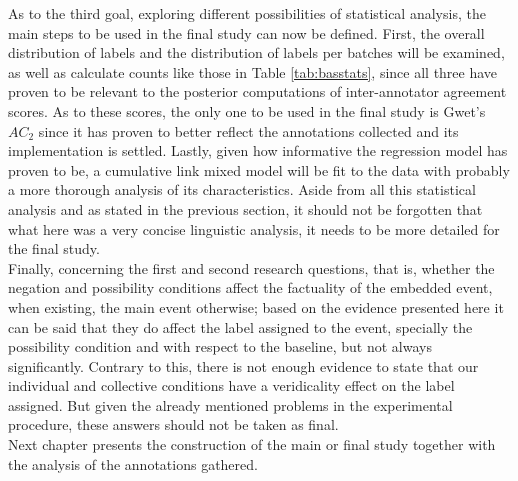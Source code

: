 As to the third goal, exploring different possibilities of statistical analysis, the main steps to be used in the final study can now be defined. First, the overall distribution of labels and the distribution of labels per batches will be examined, as well as calculate counts like those in Table \ref{tab:basstats}, since all three have proven to be relevant to the posterior computations of inter-annotator agreement scores. As to these scores, the only one to be used in the final study is Gwet's $AC_2$ since it has proven to better reflect the annotations collected and its implementation is settled. Lastly, given how informative the regression model has proven to be, a cumulative link mixed model will be fit to the data with probably a more thorough analysis of its characteristics. Aside from all this statistical analysis and as stated in the previous section, it should not be forgotten that what here was a very concise linguistic analysis, it needs to be more detailed for the final study.\\  

Finally, concerning the first and second research questions, that is, whether the negation and possibility conditions affect the factuality of the embedded event, when existing, the main event otherwise; based on the evidence presented here it can be said that they do affect the label assigned to the event, specially the possibility condition and with respect to the baseline, but not always significantly. Contrary to this, there is not enough evidence to state that our individual and collective conditions have a veridicality effect on the label assigned. But given the already mentioned problems in the experimental procedure, these answers should not be taken as final.\\

Next chapter presents the construction of the main or final study together with the analysis of the annotations gathered.